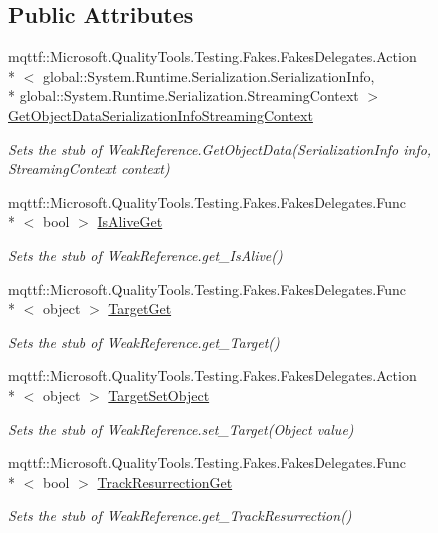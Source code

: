 \subsection*{Public Attributes}
\begin{DoxyCompactItemize}
\item 
mqttf\-::\-Microsoft.\-Quality\-Tools.\-Testing.\-Fakes.\-Fakes\-Delegates.\-Action\\*
$<$ global\-::\-System.\-Runtime.\-Serialization.\-Serialization\-Info, \\*
global\-::\-System.\-Runtime.\-Serialization.\-Streaming\-Context $>$ \hyperlink{class_system_1_1_fakes_1_1_stub_weak_reference_a41199bd1c5ea88c5c68144803c2ed42f}{Get\-Object\-Data\-Serialization\-Info\-Streaming\-Context}
\begin{DoxyCompactList}\small\item\em Sets the stub of Weak\-Reference.\-Get\-Object\-Data(\-Serialization\-Info info, Streaming\-Context context)\end{DoxyCompactList}\item 
mqttf\-::\-Microsoft.\-Quality\-Tools.\-Testing.\-Fakes.\-Fakes\-Delegates.\-Func\\*
$<$ bool $>$ \hyperlink{class_system_1_1_fakes_1_1_stub_weak_reference_af74da844b931e1e3fa109be1051c7815}{Is\-Alive\-Get}
\begin{DoxyCompactList}\small\item\em Sets the stub of Weak\-Reference.\-get\-\_\-\-Is\-Alive()\end{DoxyCompactList}\item 
mqttf\-::\-Microsoft.\-Quality\-Tools.\-Testing.\-Fakes.\-Fakes\-Delegates.\-Func\\*
$<$ object $>$ \hyperlink{class_system_1_1_fakes_1_1_stub_weak_reference_ac44d01b78c7e73d9684e47bd3570316e}{Target\-Get}
\begin{DoxyCompactList}\small\item\em Sets the stub of Weak\-Reference.\-get\-\_\-\-Target()\end{DoxyCompactList}\item 
mqttf\-::\-Microsoft.\-Quality\-Tools.\-Testing.\-Fakes.\-Fakes\-Delegates.\-Action\\*
$<$ object $>$ \hyperlink{class_system_1_1_fakes_1_1_stub_weak_reference_a7f3984e1d56d4263058554e4ebed427f}{Target\-Set\-Object}
\begin{DoxyCompactList}\small\item\em Sets the stub of Weak\-Reference.\-set\-\_\-\-Target(\-Object value)\end{DoxyCompactList}\item 
mqttf\-::\-Microsoft.\-Quality\-Tools.\-Testing.\-Fakes.\-Fakes\-Delegates.\-Func\\*
$<$ bool $>$ \hyperlink{class_system_1_1_fakes_1_1_stub_weak_reference_adebd0dd0848ef1e41390547dd3fbfa7d}{Track\-Resurrection\-Get}
\begin{DoxyCompactList}\small\item\em Sets the stub of Weak\-Reference.\-get\-\_\-\-Track\-Resurrection()\end{DoxyCompactList}\end{DoxyCompactItemize}

